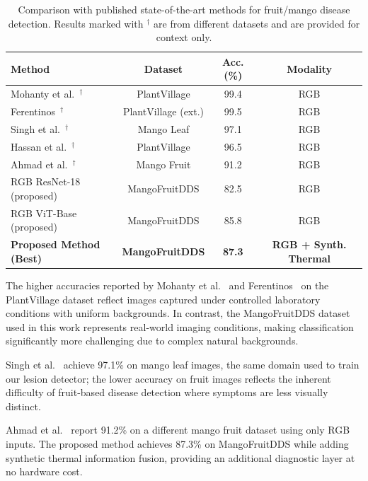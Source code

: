 \documentclass[utf8]{FrontiersinHarvard} %
\begin{document}
\begin{table}[h!]
    \caption{Comparison with published state-of-the-art methods for fruit/mango disease detection. Results marked with $^{\dagger}$ are from different datasets and are provided for context only.}
    \label{tab:sota}
    \raggedright
    \scriptsize
    \begin{tabular}{lccc}
        \toprule
        \textbf{Method} & \textbf{Dataset} & \textbf{Acc. (\%)} & \textbf{Modality} \\
        \midrule
        Mohanty et al.~\cite{mohanty2016}$^{\dagger}$ & PlantVillage & 99.4 & RGB \\
        Ferentinos~\cite{ferentinos2018}$^{\dagger}$ & PlantVillage (ext.) & 99.5 & RGB \\
        Singh et al.~\cite{singh2019}$^{\dagger}$ & Mango Leaf & 97.1 & RGB \\
        Hassan et al.~\cite{hassan2021}$^{\dagger}$ & PlantVillage & 96.5 & RGB \\
        Ahmad et al.~\cite{ahmad2023}$^{\dagger}$ & Mango Fruit & 91.2 & RGB \\
        \midrule
        RGB ResNet-18 (proposed) & MangoFruitDDS & 82.5 & RGB \\
        RGB ViT-Base (proposed) & MangoFruitDDS & 85.8 & RGB \\
        \textbf{Proposed Method (Best)} & \textbf{MangoFruitDDS} & \textbf{87.3} & \textbf{RGB + Synth. Thermal} \\
        \bottomrule
    \end{tabular}
\end{table}

The higher accuracies reported by Mohanty et al.~\cite{mohanty2016} and Ferentinos~\cite{ferentinos2018} on the PlantVillage dataset reflect images captured under controlled laboratory conditions with uniform backgrounds. In contrast, the MangoFruitDDS dataset used in this work represents real-world imaging conditions, making classification significantly more challenging due to complex natural backgrounds.

Singh et al.~\cite{singh2019} achieve 97.1\% on mango leaf images, the same domain used to train our lesion detector; the lower accuracy on fruit images reflects the inherent difficulty of fruit-based disease detection where symptoms are less visually distinct.

Ahmad et al.~\cite{ahmad2023} report 91.2\% on a different mango fruit dataset using only RGB inputs. The proposed method achieves 87.3\% on MangoFruitDDS while adding synthetic thermal information fusion, providing an additional diagnostic layer at no hardware cost.
\end{document}
